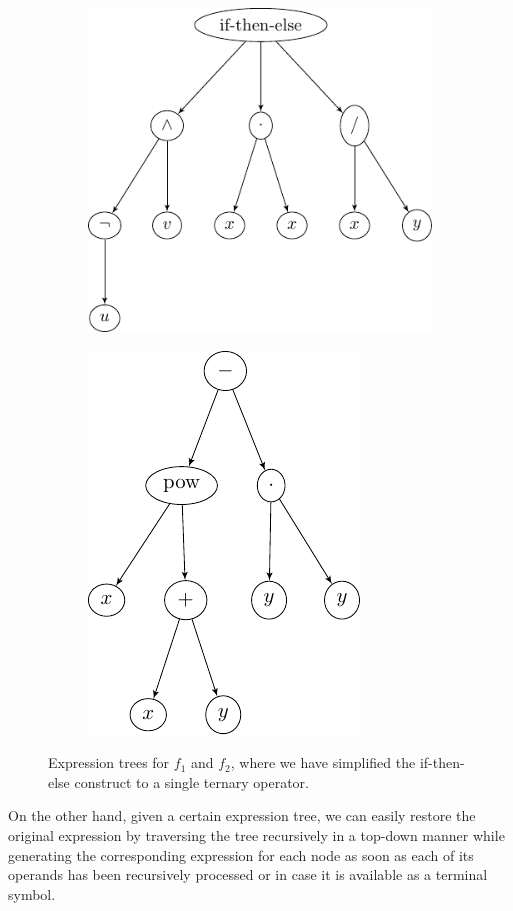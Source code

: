 \begin{figure}
	\begin{subfigure}{0.59\textwidth}
		\includegraphics{figures/gp_expression_tree1.pdf}
	\end{subfigure}
	\begin{subfigure}{0.41\textwidth}
		\includegraphics{figures/gp_expression_tree2.pdf}
	\end{subfigure}
 \caption{Expression trees for $f_1$ and $f_2$, where we have simplified the if-then-else construct to a single ternary operator.}
 \label{fig:gp-expression-tree-examples}
\end{figure}
On the other hand, given a certain expression tree, we can easily restore the original expression by traversing the tree recursively in a top-down manner while generating the corresponding expression for each node as soon as each of its operands has been recursively processed or in case it is available as a terminal symbol.
